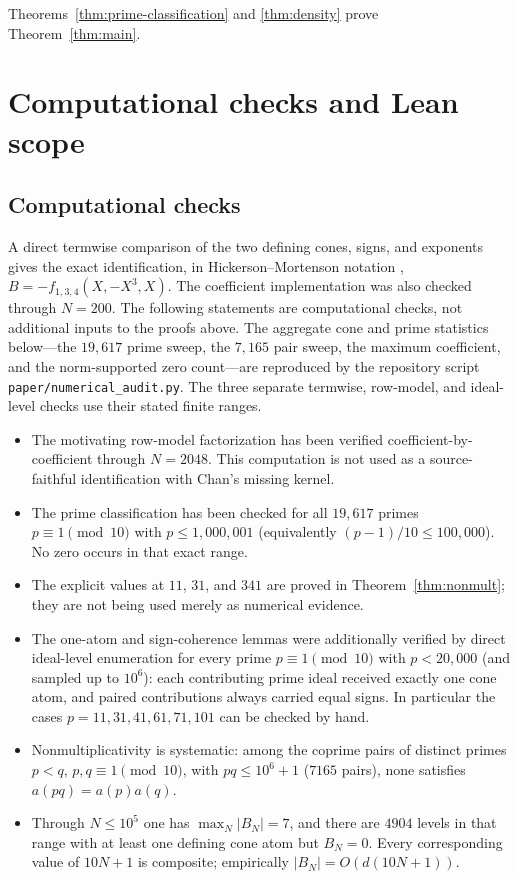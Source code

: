 \documentclass[12pt]{amsart}
\theoremstyle{definition}
\theoremstyle{remark}
\begin{document}
Theorems~\ref{thm:prime-classification} and \ref{thm:density} prove
Theorem~\ref{thm:main}.

\section{Computational checks and Lean scope}\label{sec:verification}

\subsection{Computational checks}

A direct termwise comparison of the two defining cones, signs, and
exponents gives the exact identification, in Hickerson--Mortenson
notation \cite{jHiMo14},
$B=-f_{1,3,4}(X,-X^3,X)$.  The coefficient implementation was also
checked through $N=200$.  The following statements are computational
checks, not additional inputs to the proofs above.  The aggregate cone and
prime statistics below---the $19{,}617$ prime sweep, the $7{,}165$ pair
sweep, the maximum coefficient, and the norm-supported zero count---are
reproduced by the repository script
\texttt{paper/numerical\_audit.py}.  The
three separate termwise, row-model, and ideal-level checks use their stated
finite ranges.

\begin{itemize}
\item The motivating row-model factorization has been verified
coefficient-by-coefficient through $N=2048$.  This computation is not
used as a source-faithful identification with Chan's missing kernel.
\item The prime classification has been checked for all $19{,}617$
primes $p\equiv1\pmod{10}$ with
$p\leq1{,}000{,}001$ (equivalently $(p-1)/10\leq100{,}000$).
No zero occurs in that exact range.
\item The explicit values at $11$, $31$, and $341$ are proved in
Theorem~\ref{thm:nonmult}; they are not being used merely as numerical
evidence.
\item The one-atom and sign-coherence lemmas were additionally
verified by direct ideal-level enumeration for every prime
$p\equiv1\pmod{10}$ with $p<20{,}000$ (and sampled up to $10^6$):
each contributing prime ideal received exactly one cone atom, and
paired contributions always carried equal signs.  In particular the
cases $p=11,31,41,61,71,101$ can be checked by hand.
\item Nonmultiplicativity is systematic: among the coprime pairs of
distinct primes $p<q$, $p,q\equiv1\pmod{10}$, with
$pq\leq10^6+1$ ($7165$ pairs),
none satisfies $a(pq)=a(p)a(q)$.
\item Through $N\leq10^5$ one has $\max_N|B_N|=7$, and there are
$4904$ levels in that range with at least one defining cone atom but
$B_N=0$.  Every corresponding value of $10N+1$ is composite; empirically
$|B_N|=O(d(10N+1))$.
\end{itemize}
\end{document}
